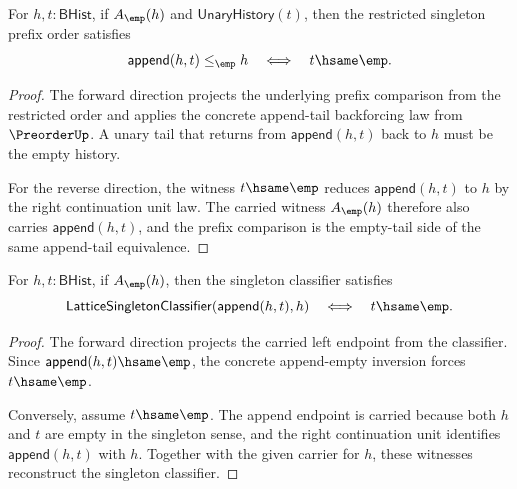 \begin{theorem}
\label{thm:lattice-singleton-le-append-tail-empty}
For $h,t:\mathsf{BHist}$, if $A_{\emp}(h)$ and
$\mathsf{UnaryHistory}(t)$, then the restricted singleton prefix order
satisfies
$$
\mathsf{append}(h,t)\le_{\emp} h
\quad\Longleftrightarrow\quad
t\hsame\emp.
$$
\end{theorem}
\begin{proof}
The forward direction projects the underlying prefix comparison from the
restricted order and applies the concrete append-tail backforcing law from
\(\PreorderUp\). A unary tail that returns from $\mathsf{append}(h,t)$ back
to $h$ must be the empty history.

For the reverse direction, the witness $t\hsame\emp$ reduces
$\mathsf{append}(h,t)$ to $h$ by the right continuation unit law. The carried
witness $A_{\emp}(h)$ therefore also carries $\mathsf{append}(h,t)$, and the
prefix comparison is the empty-tail side of the same append-tail equivalence.
\end{proof}

\begin{theorem}
\label{thm:lattice-singleton-classifier-append-tail-empty}
For $h,t:\mathsf{BHist}$, if $A_{\emp}(h)$, then the singleton classifier
satisfies
$$
\mathsf{LatticeSingletonClassifier}(\mathsf{append}(h,t),h)
\quad\Longleftrightarrow\quad
t\hsame\emp.
$$
\end{theorem}
\begin{proof}
The forward direction projects the carried left endpoint from the classifier.
Since $\mathsf{append}(h,t)\hsame\emp$, the concrete append-empty inversion
forces $t\hsame\emp$.

Conversely, assume $t\hsame\emp$. The append endpoint is carried because both
$h$ and $t$ are empty in the singleton sense, and the right continuation unit
identifies $\mathsf{append}(h,t)$ with $h$. Together with the given carrier for
$h$, these witnesses reconstruct the singleton classifier.
\end{proof}

